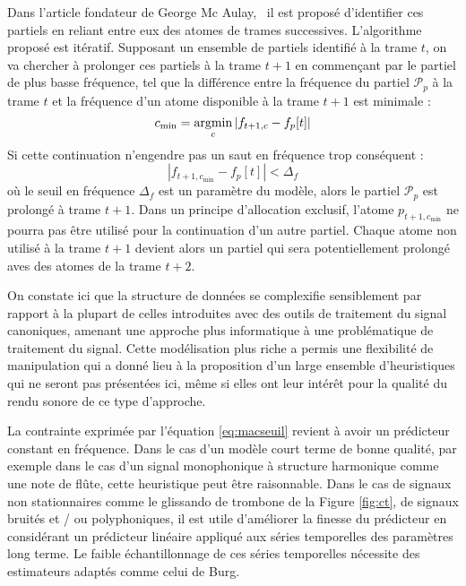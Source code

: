 Dans l'article fondateur de George Mc Aulay,~\cite{mcaulay} il est proposé \og d'identifier \fg ces partiels en reliant entre eux des atomes de trames successives. L'algorithme proposé est itératif. Supposant un ensemble de partiels identifié à la trame $t$, on va chercher à prolonger ces partiels à la trame $t+1$ en commençant par le partiel de plus basse fréquence, tel que la différence entre la fréquence du partiel $\mathcal{P}_{p}$ à la trame $t$ et la fréquence d'un atome disponible à la trame $t+1$ est minimale :
\begin{equation}
c_{\mathrm{min}} = \operatorname*{argmin}_{c}\left|f_{t+1, c}-f_{p}[t]\right|
\label{eq:mac}
\end{equation}
Si cette continuation n'engendre pas un saut en fréquence trop conséquent :
\begin{equation}
\left|f_{t+1, c_{\mathrm{min}}}-f_{p}[t]\right|<\Delta_{f}
\label{eq:macseuil}
\end{equation}
où le seuil en fréquence $\Delta_{f}$ est un paramètre du modèle, alors le partiel $\mathcal{P}_{p}$ est prolongé à trame $t+1$. Dans un principe d'allocation exclusif, l'atome $p_{t+1, c_{\mathrm{min}}}$ ne pourra pas être utilisé pour la continuation d'un autre partiel. Chaque atome non utilisé à la trame $t+1$ devient alors un partiel qui sera potentiellement prolongé aves des atomes de la trame $t+2$.

On constate ici que la structure de données se complexifie sensiblement par rapport à la plupart de celles introduites avec des outils de traitement du signal canoniques, amenant une approche plus \og informatique \fg à une problématique de traitement du signal. Cette modélisation plus riche a permis une flexibilité de manipulation qui a donné lieu à la proposition d'un large ensemble d'heuristiques qui ne seront pas présentées ici, même si elles ont leur intérêt pour la qualité du rendu sonore de ce type d'approche.



La contrainte exprimée par l'équation \ref{eq:macseuil} revient à avoir un prédicteur constant en fréquence. Dans le cas d'un modèle court terme de bonne qualité, par exemple dans le cas d'un signal monophonique à structure harmonique comme une note de flûte, cette heuristique peut être raisonnable. Dans le cas de signaux non stationnaires comme le glissando de trombone de la Figure \ref{fig:ct}, de signaux bruités et / ou polyphoniques, il est utile d'améliorer la finesse du prédicteur en considérant un prédicteur linéaire appliqué aux séries temporelles des paramètres long terme. Le faible échantillonnage de ces séries temporelles nécessite des estimateurs adaptés comme celui de Burg.~\cite{burg1968new}

